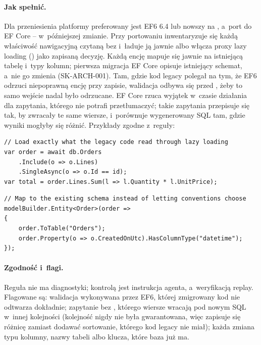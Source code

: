\paragraph{Jak spełnić.} Dla przeniesienia platformy preferowany jest EF6 6.4 lub nowszy na
, a~port do EF Core -- w~późniejszej zmianie. Przy portowaniu
inwentaryzuje się każdą właściwość nawigacyjną czytaną bez  i~ładuje ją
jawnie albo włącza proxy lazy loading () jako zapisaną
decyzję. Każdą encję mapuje się jawnie na istniejącą tabelę i~typy kolumn; pierwsza migracja
EF Core opisuje istniejący schemat, a~nie go zmienia (SK-ARCH-001). Tam, gdzie kod legacy
polegał na tym, że EF6 odrzuci niepoprawną encję przy zapisie, walidacja odbywa się przed
, żeby to samo wejście nadal było odrzucane. EF Core rzuca wyjątek
w~czasie działania dla zapytania, którego nie potrafi przetłumaczyć; takie zapytania
przepisuje się tak, by zwracały te same wiersze, i~porównuje wygenerowany SQL tam, gdzie
wyniki mogłyby się różnić. Przykłady zgodne z~reguły:

\begin{lstlisting}
// Load exactly what the legacy code read through lazy loading
var order = await db.Orders
    .Include(o => o.Lines)
    .SingleAsync(o => o.Id == id);
var total = order.Lines.Sum(l => l.Quantity * l.UnitPrice);
\end{lstlisting}

\begin{lstlisting}
// Map to the existing schema instead of letting conventions choose
modelBuilder.Entity<Order>(order =>
{
    order.ToTable("Orders");
    order.Property(o => o.CreatedOnUtc).HasColumnType("datetime");
});
\end{lstlisting}

\paragraph{Zgodność i~flagi.} Reguła nie ma diagnostyki; kontrolą jest instrukcja agenta,
a~weryfikacją replay. Flagowane są: walidacja wykonywana przez EF6, której zmigrowany kod nie
odtwarza dokładnie; zapytanie bez , którego wiersze wracają pod nowym SQL
w~innej kolejności (kolejność nigdy nie była gwarantowana, więc zapisuje się różnicę zamiast
dodawać sortowanie, którego kod legacy nie miał); każda zmiana typu kolumny, nazwy tabeli albo
klucza, które baza już ma.


